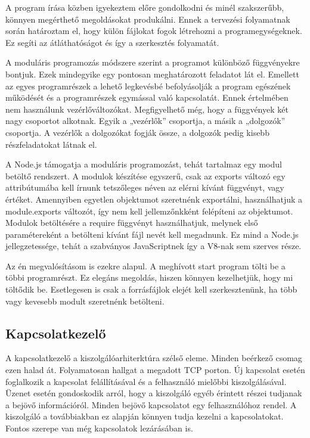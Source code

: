 \documentclass[]{article}
\begin{document}
A program írása közben igyekeztem előre gondolkodni és minél
szakszerűbb, könnyen megérthető megoldásokat produkálni. Ennek a
tervezési folyamatnak során határoztam el, hogy külön fájlokat fogok
létrehozni a programegységeknek. Ez segíti az átláthatóságot és így a
szerkesztés folyamatát.

A moduláris programozás módszere szerint a programot különböző
függvényekre bontjuk. Ezek mindegyike egy pontosan meghatározott
feladatot lát el. Emellett az egyes programrészek a lehető legkevésbé
befolyásolják a program egészének működését és a programrészek egymással
való kapcsolatát. Ennek értelmében nem használunk vezérlőváltozókat.
Megfigyelhető még, hogy a függvények két nagy csoportot alkotnak. Egyik
a „vezérlők'' csoportja, a másik a „dolgozók'' csoportja. A vezérlők a
dolgozókat fogják össze, a dolgozók pedig kisebb részfeladatokat látnak
el.

A Node.js támogatja a moduláris programozást, tehát tartalmaz egy modul
betöltő rendszert. A modulok készítése egyszerű, csak az exports változó
egy attribútumába kell írnunk tetszőleges néven az elérni kívánt
függvényt, vagy értéket. Amennyiben egyetlen objektumot szeretnénk
exportálni, használhatjuk a module.exports változót, így nem kell
jellemzőnkként felépíteni az objektumot. Modulok betöltésére a require
függvényt használhatjuk, melynek első paramétereként a betölteni kívánt
fájl nevét kell megadnunk. Ez mind a Node.js jellegzetessége, tehát a
szabványos JavaScriptnek így a V8-nak sem szerves része.

Az én megvalósításom is ezekre alapul. A meghívott start program tölti
be a többi programrészt. Ez elegáns megoldás, hiszen könnyen
kezelhetjük, hogy mi töltődik be. Esetlegesen is csak a forrásfájlok
elejét kell szerkesztenünk, ha több vagy kevesebb modult szeretnénk
betölteni.

\hypertarget{kapcsolatkezelux151}{%
\subsection{Kapcsolatkezelő}\label{kapcsolatkezelux151}}

A kapcsolatkezelő a kiszolgálóarhiterktúra szélső eleme. Minden beérkező
csomag ezen halad át. Folyamatosan hallgat a megadott TCP porton. Új
kapcsolat esetén foglalkozik a kapcsolat felállításával és a felhasználó
mielőbbi kiszolgálásával. Üzenet esetén gondoskodik arról, hogy a
kiszolgáló egyéb érintett részei tudjanak a bejövő információról. Minden
bejövő kapcsolatot egy felhasználóhoz rendel. A kiszolgáló a
továbbiakban ez alapján könnyen tudja kezelni a kapcsolatokat. Fontos
szerepe van még kapcsolatok lezárásában is.
\end{document}

